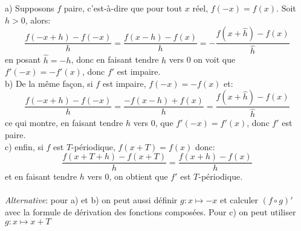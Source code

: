a) Supposons $f$ paire, c'est-à-dire que pour tout $x$ réel, $f(-x)=f(x)$. Soit $h>0$, alors:
\[
\frac{f(-x+h)-f(-x)}{h} = \frac{f(x-h)-f(x)}{h} = - \frac{f(x+\hat{h})-f(x)}{\hat{h}}
\]
en posant $\hat{h}=-h$, donc en faisant tendre $h$ vers 0 on voit que $f'(-x)=-f'(x)$, donc $f'$ est impaire.\\
b) De la même façon, si $f$ est impaire, $f(-x)=-f(x)$ et:
\[
\frac{f(-x+h)-f(-x)}{h} = \frac{-f(x-h)+f(x)}{h} = \frac{f(x+\hat{h})-f(x)}{\hat{h}}
\]
ce qui montre, en faisant tendre $h$ vers 0, que $f'(-x)=f'(x)$, donc $f'$ est paire.\\
c) enfin, si $f$ est $T$-périodique, $f(x+T)=f(x)$ donc:
\[
\frac{f(x+T+h)-f(x+T)}{h} = \frac{f(x+h)-f(x)}{h} 
\]
et en faisant tendre $h$ vers 0, on obtient que $f'$ est $T$-périodique. \\ \\
\textit{Alternative}: pour a) et b) on peut aussi définir $g:x \mapsto-x$ et calculer $(f\circ g)'$ avec la formule de dérivation des fonctions composées. Pour c) on peut utiliser $g: x \mapsto x+T$
